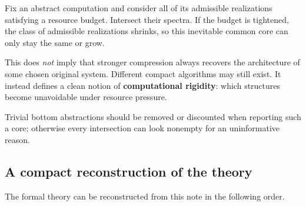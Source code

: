 \documentclass[11pt,a4paper]{article}
\begin{document}
\begin{consequencebox}[title={12. Resource restriction can enlarge the inevitable common core}]
Fix an abstract computation and consider all of its admissible realizations satisfying a resource budget. Intersect their spectra. If the budget is tightened, the class of admissible realizations shrinks, so this inevitable common core can only stay the same or grow.

This does \emph{not} imply that stronger compression always recovers the architecture of some chosen original system. Different compact algorithms may still exist. It instead defines a clean notion of \textbf{computational rigidity}: which structures become unavoidable under resource pressure.

Trivial bottom abstractions should be removed or discounted when reporting such a core; otherwise every intersection can look nonempty for an uninformative reason.
\end{consequencebox}

\subsection{A compact reconstruction of the theory}

The formal theory can be reconstructed from this note in the following order.
\end{document}
